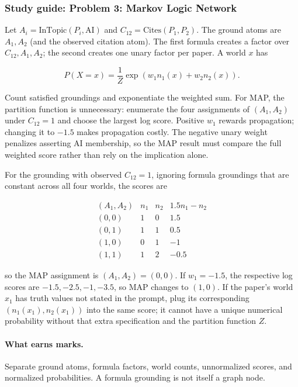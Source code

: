 \documentclass[11pt,a4paper]{article}
\begin{document}
\subsubsection{Study guide: Problem 3: Markov Logic Network}

Let $A_i=\mathrm{InTopic}(P_i,\mathrm{AI})$ and $C_{12}=\mathrm{Cites}(P_1,P_2)$. The ground atoms are $A_1,A_2$ (and the observed citation atom). The first formula creates a factor over $C_{12},A_1,A_2$; the second creates one unary factor per paper. A world $x$ has

\[
P(X=x)=\frac{1}{Z}\exp\left(w_1n_1(x)+w_2n_2(x)\right).
\]

Count satisfied groundings and exponentiate the weighted sum. For MAP, the partition function is unnecessary: enumerate the four assignments of $(A_1,A_2)$ under $C_{12}=1$ and choose the largest log score. Positive $w_1$ rewards propagation; changing it to $-1.5$ makes propagation costly. The negative unary weight penalizes asserting AI membership, so the MAP result must compare the full weighted score rather than rely on the implication alone.

For the grounding with observed $C_{12}=1$, ignoring formula groundings that are constant across all four worlds, the scores are

\[
\begin{array}{c|c|c|c}
(A_1,A_2) & n_1 & n_2 & 1.5n_1-n_2 \\
\hline
(0,0) & 1 & 0 & 1.5 \\
(0,1) & 1 & 1 & 0.5 \\
(1,0) & 0 & 1 & -1 \\
(1,1) & 1 & 2 & -0.5
\end{array}
\]

so the MAP assignment is $(A_1,A_2)=(0,0)$. If $w_1=-1.5$, the respective log scores are $-1.5,-2.5,-1,-3.5$, so MAP changes to $(1,0)$. If the paper's world $x_1$ has truth values not stated in the prompt, plug its corresponding $(n_1(x_1),n_2(x_1))$ into the same score; it cannot have a unique numerical probability without that extra specification and the partition function $Z$.

\paragraph{What earns marks.}

Separate ground atoms, formula factors, world counts, unnormalized scores, and normalized probabilities. A formula grounding is not itself a graph node.
\end{document}
